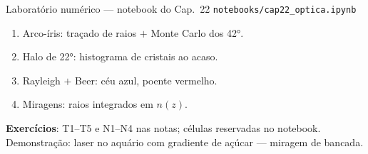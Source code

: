 \documentclass[aspectratio=169,11pt]{beamer}
\begin{document}
\begin{frame}{Laboratório numérico --- notebook do Cap.~22}
  \texttt{notebooks/cap22\_optica.ipynb}
  \begin{enumerate}
    \item Arco-íris: traçado de raios $+$ Monte Carlo dos 42°.
    \item Halo de 22°: histograma de cristais ao acaso.
    \item Rayleigh $+$ Beer: céu azul, poente vermelho.
    \item Miragens: raios integrados em $n(z)$.
  \end{enumerate}
  \vspace{0.4em}
  \textbf{Exercícios}: T1--T5 e N1--N4 nas notas; células reservadas no
  notebook. Demonstração: laser no aquário com gradiente de açúcar —
  miragem de bancada.
  \vfill
  \atribuicao
\end{frame}
\end{document}
